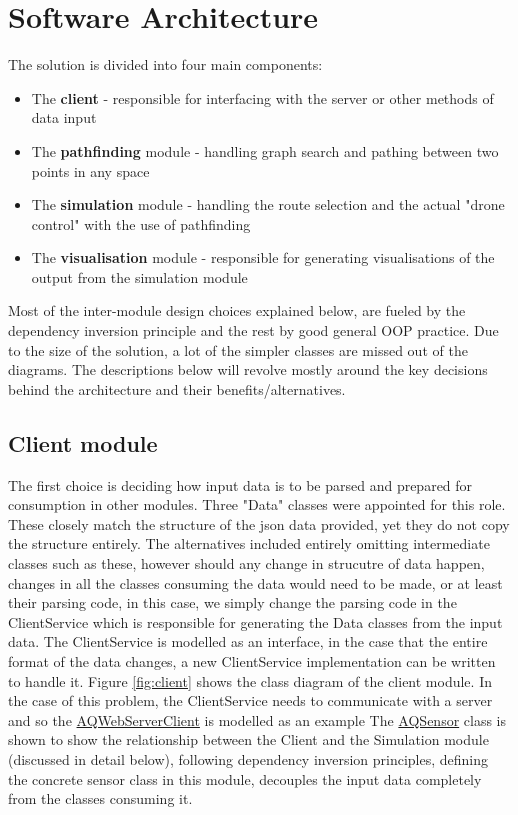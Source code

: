 \documentclass[10pt,a4paper]{article}
\begin{document}
{}


\section{Software Architecture}
The solution is divided into four main components: 
\begin{itemize}
    \item The \textbf{client} - responsible for interfacing with the server or other methods of data input
    \item The \textbf{pathfinding} module - handling graph search and pathing between two points in any space
    \item The \textbf{simulation} module - handling the route selection and the actual "drone control" with the use of pathfinding
    \item The \textbf{visualisation} module - responsible for generating visualisations of the output from the simulation module
\end{itemize}

Most of the inter-module design choices explained below, are fueled by the dependency inversion principle and the rest by good general OOP practice. 
Due to the size of the solution, a lot of the simpler classes are missed out of the diagrams. 
The descriptions below will revolve mostly around the key decisions behind the architecture and their benefits/alternatives.

\subsection{Client module}
The first choice is deciding how input data is to be parsed and prepared for consumption in other modules. Three "Data" classes were appointed for this role.
These closely match the structure of the json data provided, yet they do not copy the structure entirely. The alternatives included entirely omitting intermediate classes such as these, however
should any change in strucutre of data happen, changes in all the classes consuming the data would need to be made, or at least their parsing code, in this case, we simply change the parsing code in the ClientService which 
is responsible for generating the Data classes from the input data. The ClientService is modelled as an interface, in the case that the entire format of the data changes, a new ClientService implementation can be written 
to handle it. Figure \ref{fig:client} shows the class diagram of the client module. In the case of this problem, the ClientService needs to communicate with a server and so the \hyperref[tab:AQWebServerClient]{\color{blue}AQWebServerClient} is modelled as an example
The \hyperref[tab:AQSensor]{\color{blue}AQSensor} class is shown to show the relationship between the Client and the Simulation module (discussed in detail below), following dependency inversion principles, defining the concrete sensor class in this module,
decouples the input data completely from the classes consuming it.
\end{document}
